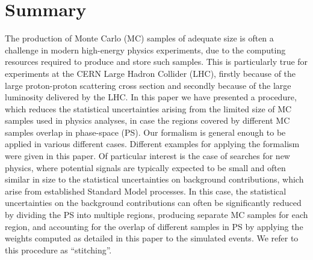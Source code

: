 \section{Summary}
\label{sec:summary}

The production of Monte Carlo (MC) samples of adequate size is often a challenge in modern high-energy physics experiments,
due to the computing resources required to produce and store such samples.
This is particularly true for experiments at the CERN Large Hadron Collider (LHC),
firstly because of the large proton-proton scattering cross section and secondly because of the large luminosity delivered by the LHC.
In this paper we have presented a procedure, which reduces the statistical uncertainties arising from the limited size of MC samples used in physics analyses,
in case the regions covered by different MC samples overlap in phase-space (PS).
Our formalism is general enough to be applied in various different cases.
Different examples for applying the formalism were given in this paper.
Of particular interest is the case of searches for new physics,
where potential signals are typically expected to be small and often similar in size to the statistical uncertainties on background contributions, 
which arise from established Standard Model processes.
In this case, the statistical uncertainties on the background contributions can often be significantly reduced 
by dividing the PS into multiple regions, producing separate MC samples for each region,
and accounting for the overlap of different samples in PS by applying the weights computed as detailed in this paper to the simulated events.
We refer to this procedure as ``stitching''.
